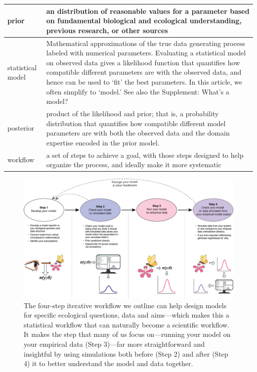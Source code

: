 \documentclass[11pt]{article}
\begin{document}
\begin{table}
\begin{tabular}{ p{3 cm}  p{13 cm} }
prior & an distribution of reasonable values for a parameter based on fundamental biological and ecological understanding, previous research, or other sources \\\hline
statistical model & Mathematical approximations of the true data generating process labeled with numerical parameters.  Evaluating a statistical model on observed data gives a likelihood function that quantifies how compatible different parameters are with the observed data, and hence can be used to `fit' the best parameters. In this article, we often simplify to `model.' See also the Supplement: What's a model? \\\hline
posterior & product of the likelihood and prior; that is, a probability distribution that quantifies how compatible different model parameters are with both the observed data and the domain expertise encoded in the prior model. \\\hline
workflow & a set of steps to achieve a goal, with those steps designed to help organize the process, and ideally make it more systematic  \\\hline
\hline
\end{tabular}
\label{tab:glossary}
\end{table}


\newpage

\begin{figure}[ht]
\centering
\noindent \includegraphics[width=1\textwidth]{figures/workflow.png}
\caption{The four-step iterative workflow we outline can help design models for specific ecological questions, data and aims---which makes this a statistical workflow that can naturally become a scientific workflow. It makes the step that many of us focus on---running your model on your empirical data (Step 3)---far more straightforward and insightful by using simulations both before (Step 2) and after (Step 4) it to better understand the model and data together.}
\label{fig:workflow}
\end{figure}
\end{document}
